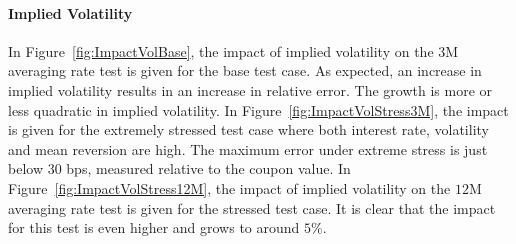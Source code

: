 \documentclass[]{pmv_report} %
\begin{document}
\paragraph{Implied Volatility}
In Figure~\ref{fig:ImpactVolBase}, the impact of implied volatility on the $3$M averaging rate test is given for the base test case.
As expected, an increase in implied volatility results in an increase in relative error.
The growth is more or less quadratic in implied volatility.
In Figure~\ref{fig:ImpactVolStress3M}, the impact is given for the extremely stressed test case where both interest rate, volatility and mean reversion are high.
The maximum error under extreme stress is just below $30$ bps, measured relative to the coupon value.
In Figure~\ref{fig:ImpactVolStress12M}, the impact of implied volatility on the $12$M averaging rate test is given for the stressed test case.
It is clear that the impact for this test is even higher and grows to around $5\%$.
\end{document}
